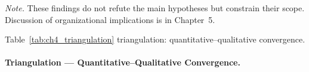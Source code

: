 \vspace{0.4em}
\noindent\textit{Note.} These findings do not refute the main hypotheses but constrain their scope. Discussion of organizational implications is in Chapter~5.

\noindent Table~\ref{tab:ch4_triangulation} triangulation: quantitative--qualitative convergence.

\paragraph{Triangulation --- Quantitative--Qualitative Convergence.}




